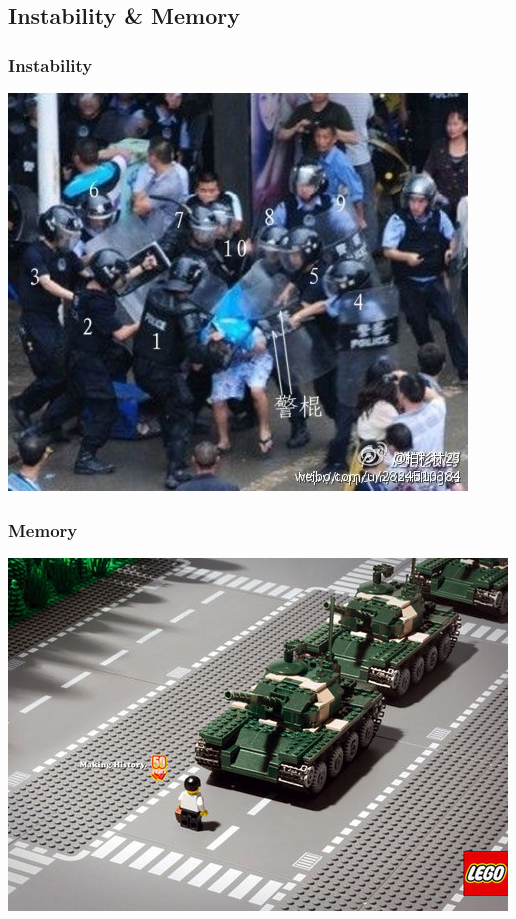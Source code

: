 \documentclass[12pt,hyperref=true,mathserif]{beamer}
\begin{document}
\subsection{Instability \& Memory}
\begin{frame}
\frametitle{Instability}
\begin{center}
\includegraphics[scale=0.45]{Instability.jpg}
\end{center}
\end{frame}

\begin{frame}
\frametitle{Memory}
\begin{center}
\includegraphics[scale=0.75]{Memory.jpeg}
\end{center}
\end{frame}
\end{document}
